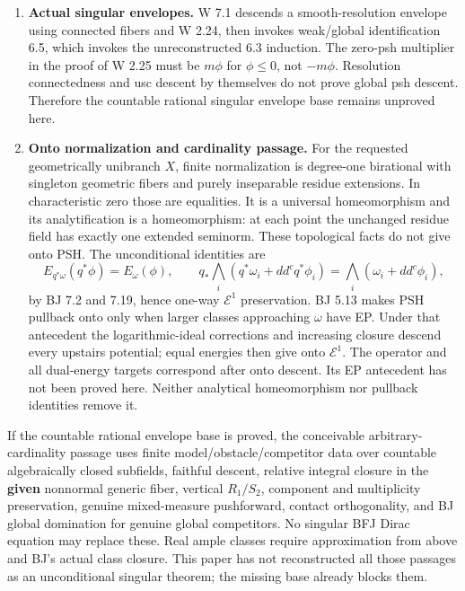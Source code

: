 \documentclass[
  10pt,
]{article}
\begin{document}
\begin{enumerate}
  case treated separately. These are repairable-looking obligations, not
  counterexamples to the desired theorem. No complete replacement of
  Rossi, local projection 6.16, or the full 6.14 induction is claimed.
  The norm equality of Section 6 cannot construct its own smooth weak
  regularization antecedent.
\item
  \textbf{Actual singular envelopes.} W 7.1 descends a smooth-resolution
  envelope using connected fibers and W 2.24, then invokes weak/global
  identification 6.5, which invokes the unreconstructed 6.3 induction.
  The zero-psh multiplier in the proof of W 2.25 must be \(m\phi\) for
  \(\phi\le0\), not \(-m\phi\). Resolution connectedness and usc descent
  by themselves do not prove global psh descent. Therefore the countable
  rational singular envelope base remains unproved here.
\item
  \textbf{Onto normalization and cardinality passage.} For the requested
  geometrically unibranch \(X\), finite normalization is degree-one
  birational with singleton geometric fibers and purely inseparable
  residue extensions. In characteristic zero those are equalities. It is
  a universal homeomorphism and its analytification is a homeomorphism:
  at each point the unchanged residue field has exactly one extended
  seminorm. These topological facts do not give onto PSH. The
  unconditional identities are
  \[E_{q^*\omega}(q^*\phi)=E_\omega(\phi),\qquad
  q_*\bigwedge_i(q^*\omega_i+dd^cq^*\phi_i)
     =\bigwedge_i(\omega_i+dd^c\phi_i),\] by BJ 7.2 and 7.19, hence
  one-way \(\mathcal E^1\) preservation. BJ 5.13 makes PSH pullback onto
  only when larger classes approaching \(\omega\) have EP. Under that
  antecedent the logarithmic-ideal corrections and increasing closure
  descend every upstairs potential; equal energies then give onto
  \(\mathcal E^1\). The operator and all dual-energy targets correspond
  after onto descent. Its EP antecedent has not been proved here.
  Neither analytical homeomorphism nor pullback identities remove it.
\end{enumerate}

If the countable rational envelope base is proved, the conceivable
arbitrary-cardinality passage uses finite model/obstacle/competitor data
over countable algebraically closed subfields, faithful descent,
relative integral closure in the \textbf{given} nonnormal generic fiber,
vertical \(R_1/S_2\), component and multiplicity preservation, genuine
mixed-measure pushforward, contact orthogonality, and BJ global
domination for genuine global competitors. No singular BFJ Dirac
equation may replace these. Real ample classes require approximation
from above and BJ's actual class closure. This paper has not
reconstructed all those passages as an unconditional singular theorem;
the missing base already blocks them.
\end{document}

